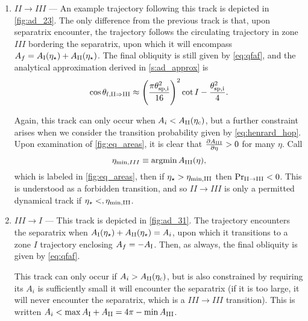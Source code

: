\documentclass[
        fleqn,
        usenatbib,
        referee,
    ]{mnras}
\newcommand*{\pd}[2]{\frac{\partial#1}{\partial#2}}
\newcommand*{\p}[1]{\left(#1\right)}
\DeclareMathOperator*{\argmin}{argmin}
\begin{document}
\begin{enumerate}
    \item $II \to III$ --- An example trajectory following this track is
        depicted in \autoref{fig:ad_23}. The only difference from the previous
        track is that, upon separatrix encounter, the trajectory follows the
        circulating trajectory in zone $III$ bordering the separatrix, upon
        which it will encompass $A_f = A_{\rm I}(\eta_\star) + A_{\rm
        II}(\eta_\star)$. The final obliquity is still given by
        \autoref{eq:qfaf}, and the analytical approximation derived in
        \autoref{s:ad_approx} is
        \begin{equation}
            \cos \theta_{\rm f, II \Rightarrow III} \approx
                \p{\frac{\pi \theta_{\rm sp, i}^2}{16}}^2 \cot I
                    - \frac{\theta_{\rm sp, i}^2}{4}.\label{eq:qf_23_approx}
        \end{equation}

        Again, this track can only occur when $A_i < A_{\rm II}(\eta_{\rm c})$, but a
        further constraint arises when we consider the transition probability
        given by \autoref{eq:henrard_hop}. Upon examination of
        \autoref{fig:eq_areas}, it is clear that $\pd{A_{\rm III}}{\eta} > 0$ for
        many $\eta$. Call
        \begin{equation}
            \eta_{\min, III} \equiv \argmin A_{\rm III}(\eta),
        \end{equation}
        which is labeled in \autoref{fig:eq_areas}, then if $\eta_\star >
        \eta_{\rm \min, III}$ then $\Pr_{\rm II \to III} < 0$. This is understood as a
        forbidden transition, and so $II \to III$ is only a permitted dynamical
        track if $\eta_\star <, \eta_{\rm \min, III}$.

    \item $III \to I$ --- This track is depicted in \autoref{fig:ad_31}.
        The trajectory encounters the separatrix when $A_{\rm I}(\eta_\star) +
        A_{\rm II}(\eta_\star) = A_i$, upon which it transitions to a zone $I$
        trajectory enclosing $A_f = -A_{\rm I}$. Then, as always, the final
        obliquity is given by \autoref{eq:qfaf}.

        This track can only occur if $A_i > A_{\rm II}(\eta_{\rm c})$, but is also
        constrained by requiring its $A_i$ is sufficiently small it will
        encounter the separatrix (if it is too large, it will never encounter
        the separatrix, which is a $III \to III$ transition). This is written
        $A_i < \max A_{\rm I} + A_{\rm II} = 4\pi - \min A_{\rm III}$.


\end{enumerate}
\end{document}
